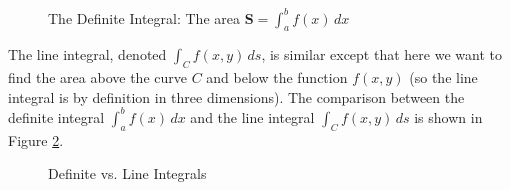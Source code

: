 \documentclass{article}
\theoremstyle{definition}
\begin{document}
\begin{figure}[H]
\caption{The Definite Integral: The area ${\mathbf S = 
         {\displaystyle \int_{a}^{b} f(x) \, dx}}$}
\label{fig:definte_integral}
\end{figure}

\smallskip
{
\noindent
The line integral, denoted ${\displaystyle \int_{C} f(x,y) \,
ds}$, is similar except that here we want to find the area above
the curve $C$ and below the function $f(x,y)$ (so the line
integral is by definition in three dimensions).  The comparison
between the definite integral ${\displaystyle \int_{a}^{b} f(x)
\, dx}$ and the line integral ${\displaystyle \int_{C} f(x,y) \,
ds}$ is shown in Figure \ref{fig:line_integral}.
\par}

\bigskip
\begin{figure}[H]
\caption{Definite vs. Line Integrals}
\label{fig:line_integral}
\end{figure}
\end{document}
